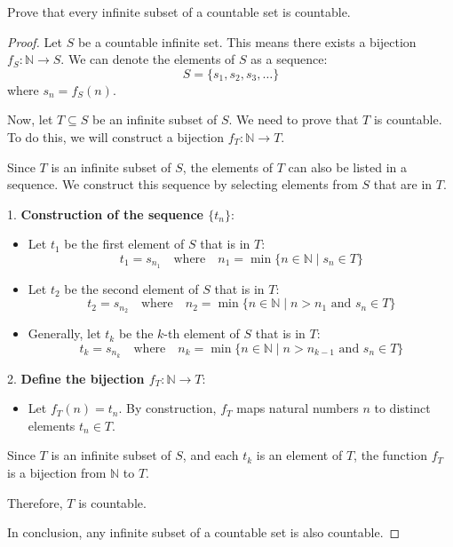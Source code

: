 \begin{exercise}
    Prove that every infinite subset of a countable set is countable. 
\end{exercise}
\begin{proof}
    Let \( S \) be a countable infinite set. This means there exists a bijection \( f_S: \mathbb{N} \to S \). We can denote the elements of \( S \) as a sequence:
    \[
    S = \{s_1, s_2, s_3, \ldots\}
    \]
    where \( s_n = f_S(n) \).

    Now, let \( T \subseteq S \) be an infinite subset of \( S \). We need to prove that \( T \) is countable. To do this, we will construct a bijection \( f_T: \mathbb{N} \to T \).

    Since \( T \) is an infinite subset of \( S \), the elements of \( T \) can also be listed in a sequence. We construct this sequence by selecting elements from \( S \) that are in \( T \).

    1. \textbf{Construction of the sequence \(\{t_n\}\)}:
        \begin{itemize}
            \item Let \( t_1 \) be the first element of \( S \) that is in \( T \):
              \[
              t_1 = s_{n_1} \quad \text{where} \quad n_1 = \min \{ n \in \mathbb{N} \mid s_n \in T \}
              \]

            \item Let \( t_2 \) be the second element of \( S \) that is in \( T \):
              \[
              t_2 = s_{n_2} \quad \text{where} \quad n_2 = \min \{ n \in \mathbb{N} \mid n > n_1 \text{ and } s_n \in T \}
              \]

            \item Generally, let \( t_k \) be the \( k \)-th element of \( S \) that is in \( T \):
              \[
              t_k = s_{n_k} \quad \text{where} \quad n_k = \min \{ n \in \mathbb{N} \mid n > n_{k-1} \text{ and } s_n \in T \}
              \]
        \end{itemize}

    2. \textbf{Define the bijection \( f_T: \mathbb{N} \to T \)}:
        \begin{itemize}
            \item Let \( f_T(n) = t_n \). By construction, \( f_T \) maps natural numbers \( n \) to distinct elements \( t_n \in T \).
        \end{itemize}

    Since \( T \) is an infinite subset of \( S \), and each \( t_k \) is an element of \( T \), the function \( f_T \) is a bijection from \(\mathbb{N}\) to \( T \).

    Therefore, \( T \) is countable.

    In conclusion, any infinite subset of a countable set is also countable.
\end{proof}

